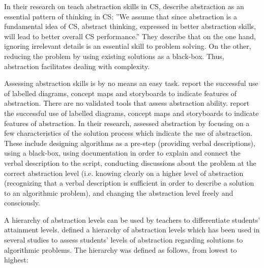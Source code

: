 In their research on teach abstraction skills in CS,  describe abstraction as an essential pattern of thinking in CS: ''We assume that since abstraction is a fundamental idea of CS, abstract thinking,
expressed in better abstraction skills, will lead to better overall CS performance.'' They describe that on the one hand, ignoring irrelevant details is an essential skill to problem solving. On the other, reducing the problem by using existing solutions as a black-box. Thus, abstraction facilitates dealing with complexity.



Assessing abstraction skills is by no means an easy task.   report the successful use of labelled diagrams, concept maps and storyboards to indicate features of abstraction. There are no validated tools that assess abstraction ability\cite{armoni2013teachingAbstraction}.  report the successful use of labelled diagrams, concept maps and storyboards to indicate features of abstraction. In their research,  assessed abstraction by focusing on a few characteristics of the solution process which indicate the use of abstraction. These include designing algorithms as a pre-step (providing verbal descriptions), using a black-box, using documentation in order to explain and connect the verbal description to the script, conducting discussions about the problem at the correct abstraction level (i.e. knowing clearly on a higher level of abstraction (recognizing that a verbal description is sufficient in order to describe a solution to an algorithmic problem), and changing the abstraction level freely and consciously.

A hierarchy of abstraction levels can be used by teachers to differentiate students' attainment levels.  defined a hierarchy of abstraction levels which has been used in several studies \cite{perrenet2005abstractionAlgorithm} \cite{perrenet2006levelsAbstractionAlgorithm}\cite{statter2016teachingAbstractThinking}
to assess students' levels of abstraction regarding solutions to algorithmic problems. The hierarchy was defined as follows, from lowest to highest:


